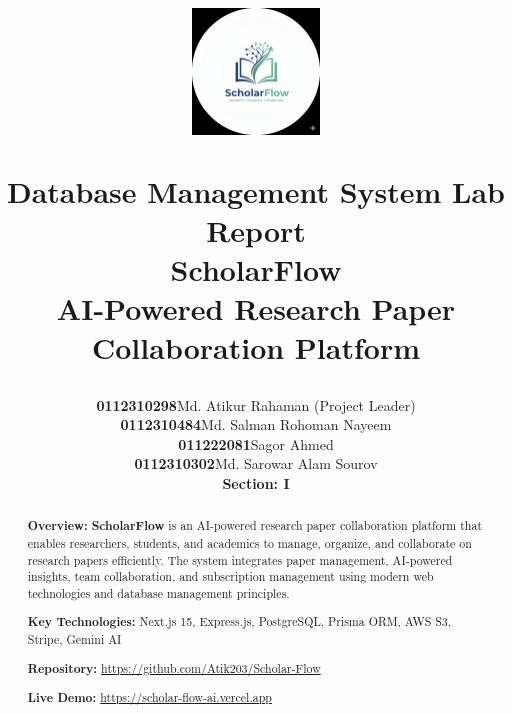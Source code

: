 \documentclass[12pt,a4paper]{report}
\title{
    \vspace{-2cm}
    \begin{figure}[h]
    \centering
    \includegraphics[width=0.3\textwidth]{images/logos/logo.png}
    \end{figure}
    \vspace{0.3cm}
    {\Large\textbf{Database Management System Lab Report}}\\
    \vspace{0.4cm}
    {\LARGE\textbf{ScholarFlow}}\\
    \vspace{0.3cm}
    {\large AI-Powered Research Paper Collaboration Platform}\\
    \vspace{0.5cm}
  
}
\author{
    \begin{tabular}{rl}
    \textbf{0112310298} & Md. Atikur Rahaman (Project Leader) \\
    \textbf{0112310484} & Md. Salman Rohoman Nayeem \\
    \textbf{011222081} & Sagor Ahmed \\
    \textbf{0112310302} & Md. Sarowar Alam Sourov \\
    \end{tabular}
     {\normalsize\textbf{Section: I}}
}
\newcommand{\projectname}{\textbf{ScholarFlow}}
\begin{document}
\maketitle
\thispagestyle{empty}

\newpage

\begin{abstract}
\noindent
\textbf{Overview:} \projectname{} is an AI-powered research paper collaboration platform that enables researchers, students, and academics to manage, organize, and collaborate on research papers efficiently. The system integrates paper management, AI-powered insights, team collaboration, and subscription management using modern web technologies and database management principles.

\vspace{0.3cm}
\noindent
\textbf{Key Technologies:} Next.js 15, Express.js, PostgreSQL, Prisma ORM, AWS S3, Stripe, Gemini AI

\vspace{0.3cm}
\noindent
\textbf{Repository:} \url{https://github.com/Atik203/Scholar-Flow}

\vspace{0.3cm}
\noindent
\textbf{Live Demo:} \url{https://scholar-flow-ai.vercel.app}
\end{abstract}

\newpage

\tableofcontents
\newpage














\nocite{*}


\end{document}

